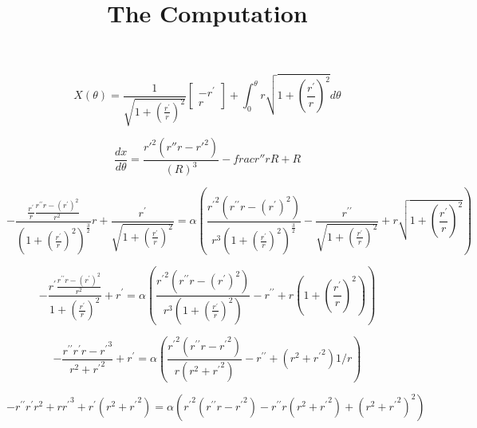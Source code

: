 \documentclass[12pt, a4paper]{report}
\title{The Computation}
\begin{document}
\maketitle

\begin{equation}
X(\theta) = \frac{1}{\sqrt{1 + \left(\frac{r^\prime}{r}\right)^2}}\begin{bmatrix} -r^\prime \\ r \end{bmatrix} + \int_0^\theta{r\sqrt{1+\left(\frac{r^\prime}{r}\right)^2}d\theta}
\end{equation}

\begin{equation}
\frac{dx}{d\theta} = \frac{{r'}^2(r''r-{r'}^2)}{(R)^3} - frac{r''r}{R} + R
\end{equation}

\begin{equation}
-\frac{\frac{r^\prime}{r} \frac{r^{\prime\prime}r - (r^\prime)^2}{r^2}}{({1 + \left(\frac{r^\prime}{r}\right)^2})^\frac{3}{2}}r + \frac{r^\prime}{\sqrt{1 + \left(\frac{r^\prime}{r}\right)^2}} =
\alpha \left(\frac{{r^\prime}^2 (r^{\prime\prime}r - (r^\prime)^2)}{r^3({1 + \left(\frac{r^\prime}{r}\right)^2})^\frac{3}{2}} - \frac{r^{\prime\prime}}{\sqrt{1 + \left(\frac{r^\prime}{r}\right)^2}} + r\sqrt{1+\left(\frac{r^\prime}{r}\right)^2}\right)
\end{equation}

\begin{equation}
-\frac{r^\prime \frac{r^{\prime\prime}r - (r^\prime)^2}{r^2}}{1 + \left(\frac{r^\prime}{r}\right)^2} + r^\prime =
\alpha \left(\frac{{r^\prime}^2 (r^{\prime\prime}r - (r^\prime)^2)}{r^3({1 + \left(\frac{r^\prime}{r}\right)^2})} - r^{\prime\prime} + r(1+\left(\frac{r^\prime}{r}\right)^2)\right)
\end{equation}

\begin{equation}
-\frac{r^{\prime\prime}r^{\prime}r - {r^\prime}^3}{r^2 + {r^\prime}^2} + r^\prime =
\alpha \left(\frac{{r^\prime}^2 (r^{\prime\prime}r - {r^\prime}^2)}{r(r^2 + {r^\prime}^2)} - r^{\prime\prime} + (r^2+{r^\prime}^2)1/r\right)
\end{equation}

\begin{equation}
-r^{\prime\prime}r^{\prime}r^2 + r{r^\prime}^3 + r^\prime(r^2 + {r^\prime}^2) =
\alpha \left({r^\prime}^2 (r^{\prime\prime}r - {r^\prime}^2) - r^{\prime\prime}r(r^2 + {r^\prime}^2) + (r^2+{r^\prime}^2)^2\right)
\end{equation}
\end{document}

